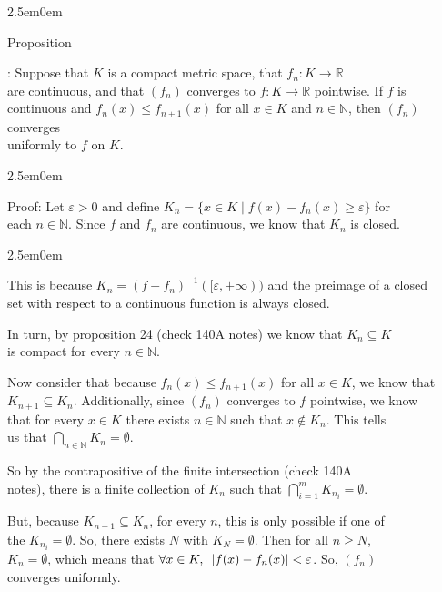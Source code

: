 \documentclass{book}
\newcommand{\hThree}{%
   \color{PineGreen!85!Orange}
   \fontsize{13}{15}\selectfont%
}
\newcommand{\hFour}{%
   \color{Cerulean}
   \fontsize{12}{14}\selectfont%
}
\newenvironment{myIndent}{%
   \begin{adjustwidth}{2.5em}{0em}%
}{%
   \end{adjustwidth}%
}
\newcommand{\myHS}{ \hspace{0.5em}}
\newcounter{PropNumber}
\newcommand{\propCount}[1][1]{%
   \addtocounter{PropNumber}{#1}%
   \thePropNumber%
}
\newcommand{\retTwo}{\hfill\bigbreak}
\begin{document}
{\begin{myIndent}
   Proposition \propCount: Suppose that $K$ is a compact metric space, that $f_n: K \longrightarrow \mathbb{R}$\\ are continuous, and that $(f_n)$ converges to $f: K \longrightarrow \mathbb{R}$ pointwise. If $f$ is\\ continuous and $f_n(x) \leq f_{n+1}(x)$ for all $x \in K$ and $n \in \mathbb{N}$, then $(f_n)$ converges\\ uniformly to $f$ on $K$.\\ [-10pt]

   {\begin{myIndent}\hThree
      Proof:
      Let $\varepsilon > 0$ and define $K_n = \{x \in K \mid f(x) - f_n(x) \geq \varepsilon\}$ for\\ each $n \in \mathbb{N}$. Since $f$ and $f_n$ are continuous, we know that $K_n$ is closed.
      {\begin{myIndent}\hFour
         This is because $K_n = (f - f_n)^{-1}([\varepsilon, +\infty))$ and the preimage of a closed\\ set with respect to a continuous function is always closed.\retTwo
      \end{myIndent}}

      In turn, by proposition 24 (check 140A notes) we know that $K_n \subseteq K$\\ is compact for every $n \in \mathbb{N}$.\retTwo

      Now consider that because $f_n(x) \leq f_{n+1}(x)$ for all $x \in K$, we know that\\ $K_{n+1} \subseteq K_n$. Additionally, since $(f_n)$ converges to $f$ pointwise, we know\\ that for every $x \in K$ there exists $n \in \mathbb{N}$ such that $x \notin K_n$. This tells\\ us that $\bigcap\limits_{n\in\mathbb{N}}K_n = \emptyset$.\retTwo 

      So by the contrapositive of the finite intersection (check 140A\\ notes), there is a finite collection of $K_n$ such that $\bigcap\limits_{i=1}^m K_{n_i} = \emptyset$.\retTwo
      
      But, because $K_{n+1} \subseteq K_n$, for every $n$, this is only possible if one of\\ the $K_{n_i} = \emptyset$. So, there exists $N$ with $K_N = \emptyset$. Then for all $n \geq N$,\\ $K_n = \emptyset$, which means that $\forall x\in K, \myHS |f(x) - f_n(x)| < \varepsilon$. So, $(f_n)$\\ converges uniformly.
      \retTwo
   \end{myIndent}}
\end{myIndent}}
\end{document}
